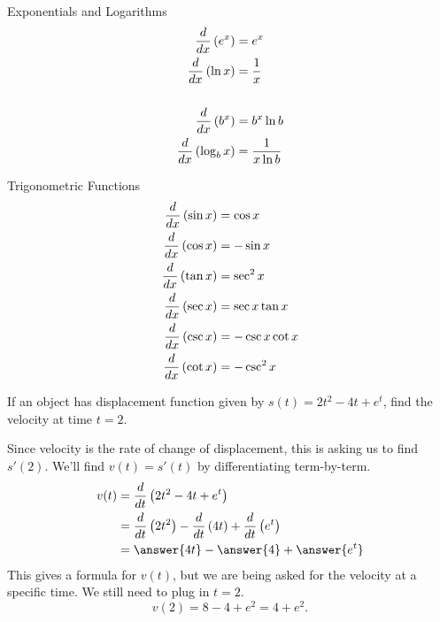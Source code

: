 \documentclass{ximera}
\begin{document}
\begin{xbox}{Exponentials and Logarithms}
	\begin{align*}
		\frac{d}{\mathop{}\!d x} \left( e^x \right) 		&= e^x\\
		\frac{d}{\mathop{}\!d x} \left( \ln x \right) 		&= \dfrac{1}{x}\\
		\\
		\frac{d}{\mathop{}\!d x} \left( b^x \right) 		&= b^x \ln b\\
		\frac{d}{\mathop{}\!d x} \left( \log_b x\right) 	&= \dfrac{1}{x \ln b}
	\end{align*}
\end{xbox}

\begin{xbox}{Trigonometric Functions}
	\begin{align*}
		\frac{d}{\mathop{}\!d x}\left( \sin x\right) 		&= \cos x\\
		\frac{d}{\mathop{}\!d x} \left( \cos x \right) 	&= - \sin x\\
		\frac{d}{\mathop{}\!d x}\left( \tan x \right) 	&= \sec^2 x\\
		\frac{d}{\mathop{}\!d x} \left( \sec x \right) 	&=  \sec x \tan x\\
		\frac{d}{\mathop{}\!d x} \left( \csc x \right) 	&= - \csc x \cot x\\
		\frac{d}{\mathop{}\!d x} \left( \cot x \right) 	&= - \csc^2 x
	\end{align*}
\end{xbox}

\begin{example}
	If an object has displacement function given by $s(t) = 2t^2 - 4t + e^t$, find the velocity at time $t = 2$.
	\begin{explanation}
		Since velocity is the rate of change of displacement, this is asking us to find $s'(2)$.  We'll find
		$v(t) = s'(t)$ by differentiating term-by-term.
		\begin{align*}
			v(t) 	&= \ddt\left(2t^2-4t+e^t \right)\\
				&= \ddt\left(2t^2\right) - \ddt\left(4t\right) + \ddt \left( e^t \right)\\
				&= \answer{4t} - \answer{4} + \answer{e^t}
		\end{align*}
		This gives a formula for $v(t)$, but we are being asked for the velocity at a specific time.  We still need to
		plug in $t = 2$.
		\[ v(2) = 8 - 4 + e^2 = 4+ e^2. \]
	\end{explanation}
\end{example}
\end{document}
